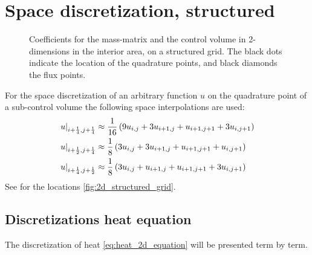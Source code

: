 \section{Space discretization, structured}
\begin{figure}[H]
    \begin{center}
        \def\svgwidth{0.80\textwidth} %
        \resizebox{0.65\textwidth}{!}{
            
        }
    \end{center}
    \caption[Definition of the grid to solve the 2D-shallow water equations in the interior area]{Coefficients for the mass-matrix and the control volume in 2-dimensions in the interior area, on a structured grid. The black dots indicate the location of the quadrature points, and black diamonds the flux points.}
    \label{fig:2d_structured_grid}
\end{figure}
For the space discretization of an arbitrary function $u$ on the quadrature point of a sub-control volume the following space interpolations are used:
\begin{align}
    \left. u\right|_{i+\frac{1}{4}, j+\frac{1}{4}} & \approx \frac{1}{16}\left( 9u_{i, j} + 3 u_{i+1,j} + u_{i+1, j+1} + 3  u_{i, j+1}\right)
    \\
    \left.u\right|_{i+\frac{1}{2}, j+\frac{1}{4}} & \approx \frac{1}{8} \left( 3 u_{i,j} + 3 u_{i+1,j} + u_{i+1, j+1} + u_{i, j+1} \right)
    \\
    \left. u \right|_{i+\frac{1}{4}, j+\frac{1}{2}} & \approx \frac{1}{8} \left( 3 u_{i, j} + u_{i+1, j} + u_{i+1, j+1}  + 3 u_{i, j+1} \right)
\end{align}
See for the locations \autoref{fig:2d_structured_grid}.
\subsection{Discretizations heat equation}
The discretization of heat \autoref{eq:heat_2d_equation} will be presented term by term.
